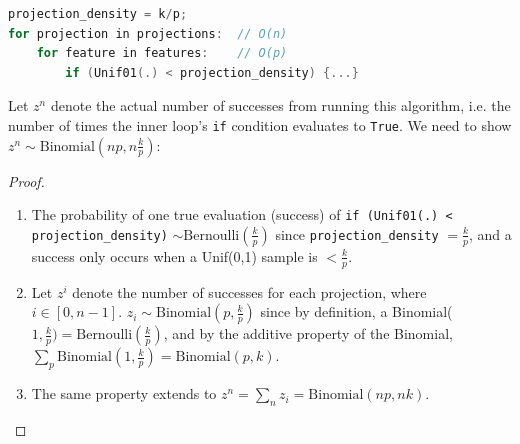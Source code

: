 \documentclass[sigconf,anonymous,review]{acmart}
\begin{document}
\begin{lstlisting}[language=c++]
projection_density = k/p;
for projection in projections:  // O(n)
    for feature in features:    // O(p)
        if (Unif01(.) < projection_density) {...}
\end{lstlisting}

Let $z^n$ denote the actual number of successes from running this algorithm, i.e. the number of times the inner loop's \texttt{if} condition evaluates to \texttt{True}. We need to show $z^n \sim \text{Binomial}(np,n\frac{k}{p})$:

\begin{proof}

\begin{enumerate}
    \item The probability of one true evaluation (success) of \texttt{if (Unif01(.) < projection\_density)} $\sim \text{Bernoulli}(\frac{k}{p})$ since \texttt{projection\_density} $=\frac{k}{p}$, and a success only occurs when a Unif(0,1) sample is $< \frac{k}{p}$.
    \item Let $z^i$ denote the number of successes for each projection, where $i\in [0,n-1]$. $z_i \sim \text{Binomial}(p,\frac{k}{p})$ since by definition, a Binomial($1,\frac{k}{p})=\text{Bernoulli}(\frac{k}{p})$, and by the additive property of the Binomial, $\sum_p \text{Binomial}(1,\frac{k}{p})=\text{Binomial}(p,k)$.
    \item The same property extends to $z^n=\sum_n z_i=\text{Binomial}(np,nk)$.
\end{enumerate}

\end{proof}

\end{document}
